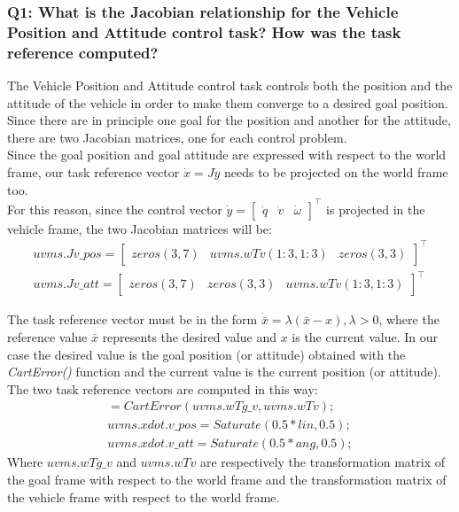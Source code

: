 \documentclass{article}
\begin{document}
\subsubsection{Q1: What is the Jacobian relationship for the Vehicle Position and Attitude control task? How was the task reference computed?}

The Vehicle Position and Attitude control task controls both the position and the attitude of the vehicle in order to make them converge to a desired goal position. Since there are in principle one goal for the position and another for the attitude, there are two Jacobian matrices, one for each control problem. \\
Since the goal position and goal attitude are expressed with respect to the world frame, our task reference vector $ \dot{x} = J\dot{y} $ needs to be projected on the world frame too. \\
For this reason, since the control vector $ \dot{y} = \begin{bmatrix} \dot{q} & \dot{v} & \dot{\omega}\end{bmatrix}^\top $ is projected in the vehicle frame, the two Jacobian matrices will be:
\begin{gather*}
uvms.Jv\_pos = \begin{bmatrix} zeros(3, 7) & uvms.wTv(1:3, 1:3) & zeros(3,3)\end{bmatrix}^\top \\
uvms.Jv\_att = \begin{bmatrix} zeros(3, 7) & zeros(3, 3) & uvms.wTv(1:3, 1:3)\end{bmatrix}^\top
\end{gather*}

The task reference vector must be in the form $ \dot{\bar{x}} = \lambda(\bar{x} - x), \lambda > 0 $, where the reference value $ \bar{x} $ represents the desired value and $ x $ is the current value. In our case the desired value is the goal position (or attitude) obtained with the \textit{CartError()} function and the current value is the current position (or attitude). \\
The two task reference vectors are computed in this way:
\begin{gather*}
[ang, lin] = CartError(uvms.wTg\_v , uvms.wTv);\\
uvms.xdot.v\_pos = Saturate(0.5 * lin, 0.5);\\
uvms.xdot.v\_att = Saturate(0.5 * ang, 0.5);
\end{gather*}
Where $ uvms.wTg\_v $ and $ uvms.wTv $ are respectively the transformation matrix of the goal frame with respect to the world frame and the transformation matrix of the vehicle frame with respect to the world frame. 
\end{document}
